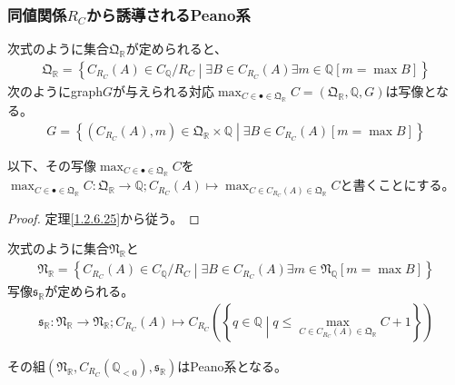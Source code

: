 \documentclass[dvipdfmx]{jsarticle}
\begin{document}
\subsubsection{同値関係$R_{C}$から誘導されるPeano系}%
\begin{thm}\label{1.2.6.26}
次式のように集合$\mathfrak{Q}_{\mathbb{R}}$が定められると、
\begin{align*}
\mathfrak{Q}_{\mathbb{R}} = \left\{ C_{R_{C}}(A) \in C_{\mathbb{Q}} /R_{C}  \middle| \exists B \in C_{R_{C}}(A)\exists m \in \mathbb{Q}\left[ m = \max B \right] \right\}
\end{align*}
次のようにgraph$G$が与えられる対応$\max_{C \in \bullet \in \mathfrak{Q}_{\mathbb{R}}}C = \left( \mathfrak{Q}_{\mathbb{R}},\mathbb{Q},G \right)$は写像となる。
\begin{align*}
G = \left\{ \left( C_{R_{C}}(A),m \right) \in \mathfrak{Q}_{\mathbb{R}} \times \mathbb{Q} \middle| \exists B \in C_{R_{C}}(A)\left[ m = \max B \right] \right\}
\end{align*}
\end{thm}\par
以下、その写像$\max_{C \in \bullet \in \mathfrak{Q}_{\mathbb{R}}}C$を$\max_{C \in \bullet \in \mathfrak{Q}_{\mathbb{R}}}C:\mathfrak{Q}_{\mathbb{R}} \rightarrow \mathbb{Q};C_{R_{C}}(A) \mapsto \max_{C \in C_{R_{C}}(A) \in \mathfrak{Q}_{\mathbb{R}}}C$と書くことにする。
\begin{proof}
定理\ref{1.2.6.25}から従う。
\end{proof}
\begin{dfn}
次式のように集合$\mathfrak{N}_{\mathbb{R}}$と
\begin{align*}
\mathfrak{N}_{\mathbb{R}} = \left\{ C_{R_{C}}(A) \in C_{\mathbb{Q}} /R_{C}  \middle| \exists B \in C_{R_{C}}(A)\exists m \in \mathfrak{N}_{\mathbb{Q}}\left[ m = \max B \right] \right\}
\end{align*}
写像$\mathfrak{s}_{\mathbb{R}}$が定められる。
\begin{align*}
\mathfrak{s}_{\mathbb{R}}:\mathfrak{N}_{\mathbb{R}} \rightarrow \mathfrak{N}_{\mathbb{R}};C_{R_{C}}(A) \mapsto C_{R_{C}}\left( \left\{ q \in \mathbb{Q} \middle| q \leq \max_{C \in C_{R_{C}}(A) \in \mathfrak{Q}_{\mathbb{R}}}C + 1 \right\} \right)
\end{align*}
\end{dfn}
\begin{thm}\label{1.2.6.27}
その組$\left( \mathfrak{N}_{\mathbb{R}},C_{R_{C}}\left( \mathbb{Q}_{< 0} \right),\mathfrak{s}_{\mathbb{R}} \right)$はPeano系となる。
\end{thm}
\end{document}
